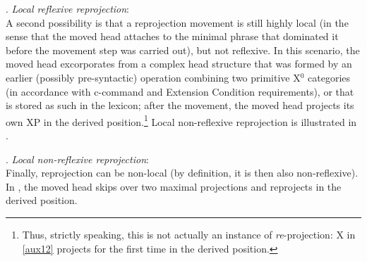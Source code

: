 \documentclass[output=paper
,modfonts
,nonflat]{langsci/langscibook}
\begin{document}
\Lsciexi. {\it Local reflexive reprojection}:\\

A second possibility is that a reprojection movement is still highly
local (in the sense that the moved head attaches to the minimal phrase
that dominated it before the movement step was carried out), but not
reflexive. In this scenario, the moved head excorporates from a complex
head structure that was formed by an earlier (possibly pre-syntactic) 
operation combining two primitive X$^0$ categories (in accordance with
c-command and Extension Condition requirements), or that is stored as
such in the lexicon; after the movement, the moved head projects its own
XP in the derived position.\footnote{Thus, strictly speaking, this is
  not actually an instance of {\it re}-projection: X in \ref{aux12}
  projects for the first time in the derived position.} Local non-reflexive
reprojection is illustrated in \Next. 

\Lsciex. {\it Local \label{aux12}non-reflexive reprojection}:\\

Finally, reprojection can be non-local (by definition, it is then also
non-reflexive). In \Next, the moved head skips over two maximal
projections and reprojects in the derived position. 
\end{document}
